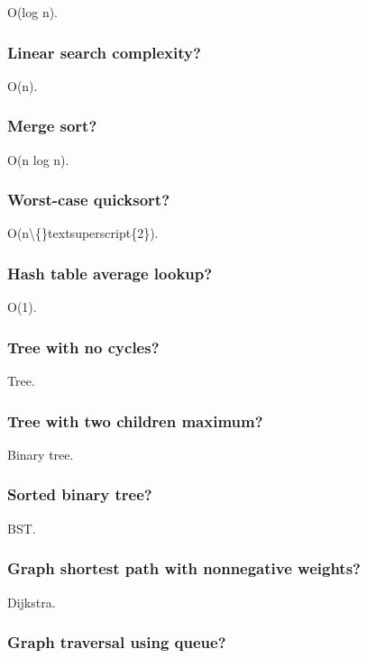 O(log n).

\subsubsection{Linear search complexity?}

O(n).

\subsubsection{Merge sort?}

O(n log n).

\subsubsection{Worst-case quicksort?}

O(n\textbackslash\{\}textsuperscript\{2\}).

\subsubsection{Hash table average lookup?}

O(1).

\subsubsection{Tree with no cycles?}

Tree.

\subsubsection{Tree with two children maximum?}

Binary tree.

\subsubsection{Sorted binary tree?}

BST.

\subsubsection{Graph shortest path with nonnegative weights?}

Dijkstra.

\subsubsection{Graph traversal using queue?}

